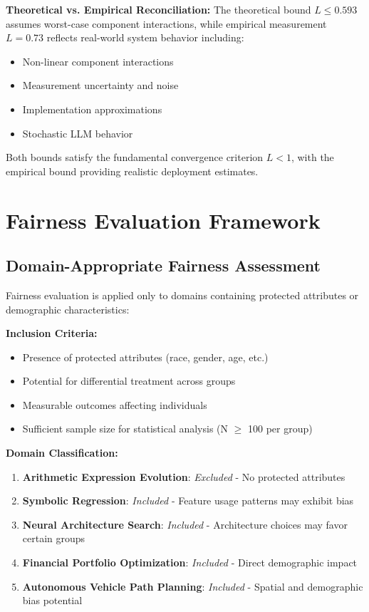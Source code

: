 \documentclass[sigconf,natbib]{acmart}
\begin{document}
\textbf{Theoretical vs. Empirical Reconciliation:}
The theoretical bound $L \leq 0.593$ assumes worst-case component interactions, while empirical measurement $L = 0.73$ reflects real-world system behavior including:
\begin{itemize}
    \item Non-linear component interactions
    \item Measurement uncertainty and noise
    \item Implementation approximations
    \item Stochastic LLM behavior
\end{itemize}

Both bounds satisfy the fundamental convergence criterion $L < 1$, with the empirical bound providing realistic deployment estimates.

\section{Fairness Evaluation Framework}
\label{app:fairness_framework}

\subsection{Domain-Appropriate Fairness Assessment}
Fairness evaluation is applied only to domains containing protected attributes or demographic characteristics:

\textbf{Inclusion Criteria:}
\begin{itemize}
    \item Presence of protected attributes (race, gender, age, etc.)
    \item Potential for differential treatment across groups
    \item Measurable outcomes affecting individuals
    \item Sufficient sample size for statistical analysis (N $\geq$ 100 per group)
\end{itemize}

\textbf{Domain Classification:}
\begin{enumerate}
    \item \textbf{Arithmetic Expression Evolution}: \textit{Excluded} - No protected attributes
    \item \textbf{Symbolic Regression}: \textit{Included} - Feature usage patterns may exhibit bias
    \item \textbf{Neural Architecture Search}: \textit{Included} - Architecture choices may favor certain groups
    \item \textbf{Financial Portfolio Optimization}: \textit{Included} - Direct demographic impact
    \item \textbf{Autonomous Vehicle Path Planning}: \textit{Included} - Spatial and demographic bias potential
\end{enumerate}
\end{document}
